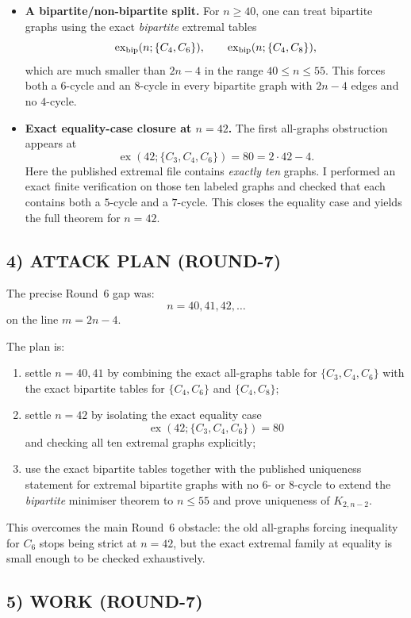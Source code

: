 \begin{itemize}
\item[(N1)] \textbf{A bipartite/non-bipartite split.}
For $n\ge 40$, one can treat bipartite graphs using the exact \emph{bipartite} extremal tables
\[
\operatorname{ex}_{\rm bip}(n;\{C_4,C_6\}),\qquad
\operatorname{ex}_{\rm bip}(n;\{C_4,C_8\}),
\]
which are much smaller than $2n-4$ in the range $40\le n\le 55$.
This forces both a $6$-cycle and an $8$-cycle in every bipartite graph with $2n-4$ edges and no $4$-cycle.

\item[(N2)] \textbf{Exact equality-case closure at $n=42$.}
The first all-graphs obstruction appears at
\[
\operatorname{ex}(42;\{C_3,C_4,C_6\})=80=2\cdot 42-4.
\]
Here the published extremal file contains \emph{exactly ten} graphs.
I performed an exact finite verification on those ten labeled graphs and checked that each contains both a $5$-cycle and a $7$-cycle.
This closes the equality case and yields the full theorem for $n=42$.
\end{itemize}

\subsection*{4) ATTACK PLAN (ROUND-7)}

The precise Round~6 gap was:
\[
n=40,41,42,\dots
\]
on the line $m=2n-4$.

The plan is:
\begin{enumerate}
\item settle $n=40,41$ by combining the exact all-graphs table for $\{C_3,C_4,C_6\}$ with the exact bipartite tables for $\{C_4,C_6\}$ and $\{C_4,C_8\}$;
\item settle $n=42$ by isolating the exact equality case
\[
\operatorname{ex}(42;\{C_3,C_4,C_6\})=80
\]
and checking all ten extremal graphs explicitly;
\item use the exact bipartite tables together with the published uniqueness statement for extremal bipartite graphs with no $6$- or $8$-cycle to extend the \emph{bipartite} minimiser theorem to $n\le 55$ and prove uniqueness of $K_{2,n-2}$.
\end{enumerate}

This overcomes the main Round~6 obstacle: the old all-graphs forcing inequality for $C_6$ stops being strict at $n=42$, but the exact extremal family at equality is small enough to be checked exhaustively.

\subsection*{5) WORK (ROUND-7)}

